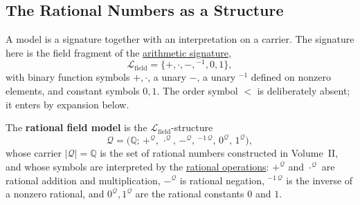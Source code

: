 %
\subsection{The Rational Numbers as a Structure}
\label{subsec:rational-numbers-as-a-structure}


\begin{remark*}[Exposition]
A model is a signature together with an interpretation on a carrier. The
signature here is the field fragment of the
\hyperref[def:arithmetic-signature]{arithmetic signature},
\[
\mathcal{L}_{\mathrm{field}}=\{+,\cdot,-,{}^{-1},0,1\},
\]
with binary function symbols $+,\cdot$, a unary $-$, a unary ${}^{-1}$ defined on
nonzero elements, and constant symbols $0,1$. The order symbol $<$ is
deliberately absent; it enters by expansion below.
\end{remark*}

\begin{definition}
\label{def:rational-field-model}
The \textbf{rational field model} is the $\mathcal{L}_{\mathrm{field}}$-structure
\[
\mathcal{Q}=\bigl(\mathbb{Q};\,
+^{\mathcal{Q}},\,\cdot^{\mathcal{Q}},\,-^{\mathcal{Q}},\,{}^{-1\,\mathcal{Q}},\,
0^{\mathcal{Q}},\,1^{\mathcal{Q}}\bigr),
\]
whose carrier $|\mathcal{Q}|=\mathbb{Q}$ is the set of rational numbers
constructed in Volume~II, and whose symbols are interpreted by the
\hyperref[def:rational-operations]{rational operations}: $+^{\mathcal{Q}}$ and
$\cdot^{\mathcal{Q}}$ are rational addition and multiplication, $-^{\mathcal{Q}}$
is rational negation, ${}^{-1\,\mathcal{Q}}$ is the inverse of a nonzero
rational, and $0^{\mathcal{Q}},1^{\mathcal{Q}}$ are the rational constants
$0$ and $1$.
\end{definition}

